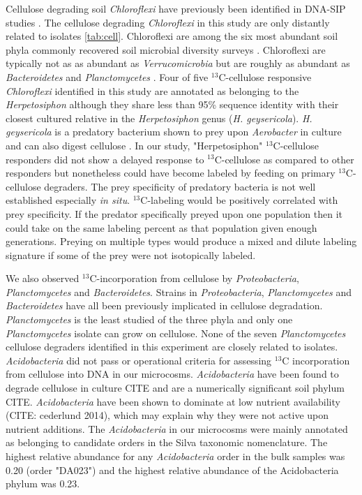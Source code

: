 Cellulose degrading soil \textit{Chloroflexi} have previously been identified
in DNA-SIP studies \citep{Schellenberger_2010}. The cellulose degrading
\textit{Chloroflexi} in this study are only distantly related to isolates
\ref{tab:cell}. Chloroflexi are among the six most abundant soil phyla commonly
recovered soil microbial diversity surveys \citep{Janssen2006}.
Chloroflexi are typically not as as abundant as \textit{Verrucomicrobia} but
are roughly as abundant as \textit{Bacteroidetes} and \textit{Planctomycetes}
\citep{Janssen2006}.  Four of five $^{13}$C-cellulose responsive
\textit{Chloroflexi} identified in this study are annotated as belonging to the
\textit{Herpetosiphon} although they share less than 95\% sequence identity with their closest cultured relative in the
\textit{Herpetosiphon} genus (\textit{H. geysericola}). \textit{H. geysericola}
is a predatory bacterium shown to prey upon \textit{Aerobacter} in culture and
can also digest cellulose \citep{Lewin1970}. In our study, "Herpetosiphon"
$^{13}$C-cellulose responders did not show a delayed response to
$^{13}$C-cellulose as compared to other responders but nonetheless could have
become labeled by feeding on primary $^{13}$C-cellulose degraders. The prey
specificity of predatory bacteria is not well established especially \textit{in
situ}. $^{13}$C-labeling would be positively correlated with prey specificity.
If the predator specifically preyed upon one population then it could take on
the same labeling percent as that population given enough generations. Preying on multiple types would
produce a mixed and dilute labeling signature if some of the prey
were not isotopically labeled.

We also observed $^{13}$C-incorporation from cellulose by
\textit{Proteobacteria}, \textit{Planctomycetes} and \textit{Bacteroidetes}. 
Strains in \textit{Proteobacteria}, \textit{Planctomycetes} and \textit{Bacteroidetes} have all been
previously implicated in cellulose degradation. \textit{Planctomycetes} is the
least studied of the three phyla and only one \textit{Planctomycetes} isolate can
grow on cellulose. None of the seven \textit{Planctomycetes} cellulose degraders
identified in this experiment are closely related to isolates.
\textit{Acidobacteria} did not pass or operational criteria for assessing
$^{13}$C incorporation from cellulose into DNA in our microcosms. 
\textit{Acidobacteria} have been found to degrade cellulose in culture CITE and
are a numerically significant soil phylum CITE. \textit{Acidobacteria} have
been shown to dominate at low nutrient availability (CITE: cederlund 2014),
which may explain why they were not active upon nutrient additions. 
The \textit{Acidobacteria} in our microcosms were mainly annotated as belonging
to candidate orders in the Silva taxonomic nomenclature. The highest relative
abundance for any \textit{Acidobacteria} order in the bulk samples was 0.20
(order "DA023") and the highest relative abundance of the Acidobacteria phylum
was 0.23.



